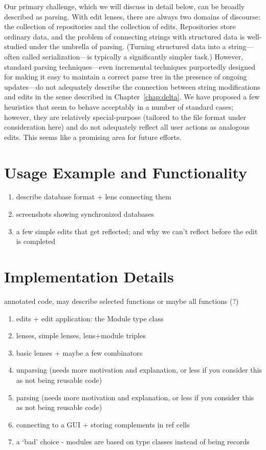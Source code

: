Our primary challenge, which we will discuss in detail below, can be broadly
described as parsing. With edit lenses, there are always two domains of
discourse: the collection of repositories and the collection of edits.
Repositories store ordinary data, and the problem of connecting strings with
structured data is well-studied under the umbrella of
parsing. (Turning structured data into a string---often called
serialization---is typically a significantly simpler task.) However,
standard parsing techniques---even incremental techniques purportedly
designed for making it easy to maintain a correct parse tree in the presence
of ongoing updates---do not adequately describe the connection between
string modifications and edits in the sense described in
Chapter~\ref{chap:delta}. We have proposed a few heuristics that seem to
behave acceptably in a number of standard cases; however, they are
relatively special-purpose (tailored to the file format under consideration
here) and do not adequately reflect all user actions as analogous edits.
This seems like a promising area for future efforts.

\section{Usage Example and Functionality}
\label{sec:impl-usage}
\begin{enumerate}
    \item describe database format + lens connecting them
    \item screenshots showing synchronized databases
    \item a few simple edits that get reflected; and why we can't reflect before the edit is completed
\end{enumerate}

\section{Implementation Details}
\label{sec:impl-details}
annotated code, may describe selected functions or maybe all functions (?)
\begin{enumerate}
    \item edits + edit application: the Module type class
    \item lenses, simple lenses, lens+module triples
    \item basic lenses + maybe a few combinators
    \item unparsing (needs more motivation and explanation, or less if you consider this as not being reusable code)
    \item parsing (needs more motivation and explanation, or less if you consider this as not being reusable code)
    \item connecting to a GUI + storing complements in ref cells
    \item a `bad' choice - modules are based on type classes instead of being records
\end{enumerate}

